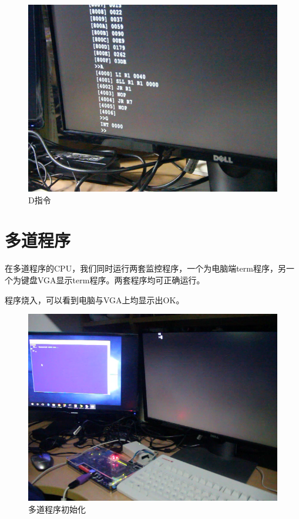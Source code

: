 \begin{figure}[H]
  \includegraphics[width=\linewidth]{Figures/picture/vlcsnap-2015-12-09-23h48m27s710.png}
  \caption{D指令}
\end{figure}




\section{多道程序}

在多道程序的CPU，我们同时运行两套监控程序，一个为电脑端term程序，另一个为键盘VGA显示term程序。两套程序均可正确运行。

程序烧入，可以看到电脑与VGA上均显示出OK。

\begin{figure}[H]
  \includegraphics[width=\linewidth]{Figures/picture/vlcsnap-2015-12-10-00h17m16s488.png}
  \caption{多道程序初始化}
\end{figure}

